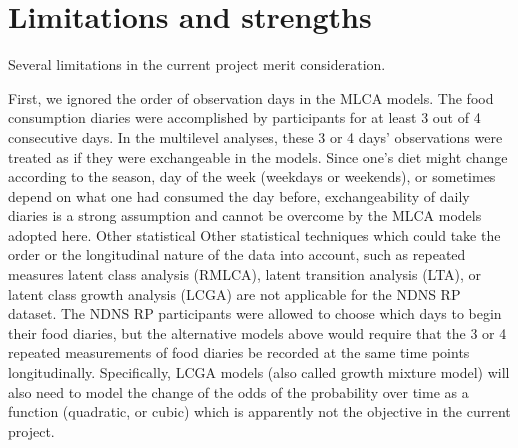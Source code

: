 










\section{Limitations and strengths}
 
Several limitations in the current project merit consideration.  

First, we ignored the order of observation days in the MLCA models. The food consumption diaries were accomplished by participants for at least 3 out of 4 consecutive days. In the multilevel analyses, these 3 or 4 days' observations were treated as if they were exchangeable in the models. Since one's diet might change according to the season, day of the week (weekdays or weekends), or sometimes depend on what one had consumed the day before, exchangeability of daily diaries is a strong assumption and cannot be overcome by the MLCA models adopted here. Other statistical Other statistical techniques which could take the order or the longitudinal nature of the data into account, such as repeated measures latent class analysis (RMLCA), latent transition analysis (LTA)\parencite{collins2010latent}, or latent class growth analysis (LCGA) \parencite{davidian2008growth,jung2008introduction,andruff2009latent} are not applicable for the NDNS RP dataset. The NDNS RP participants were allowed to choose which days to begin their food diaries, but the alternative models above would require that the 3 or 4 repeated measurements of food diaries be recorded at the same time points longitudinally. Specifically, LCGA models (also called growth mixture model) will also need to model the change of the odds of the probability over time as a function (quadratic, or cubic) which is apparently not the objective in the current project.


